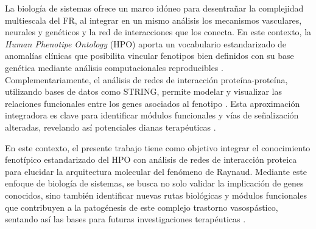 La biología de sistemas ofrece un marco idóneo para desentrañar la complejidad multiescala del FR, al integrar en un mismo análisis los mecanismos vasculares, neurales y genéticos y la red de interacciones que los conecta. En este contexto, la \textit{Human Phenotipe Ontology} (HPO) aporta un vocabulario estandarizado de anomalías clínicas que posibilita vincular fenotipos bien definidos con su base genética mediante análisis computacionales reproducibles \cite{Khler2021, Robinson2008, Groza2023}. Complementariamente, el análisis de redes de interacción proteína-proteína, utilizando bases de datos como STRING, permite modelar y visualizar las relaciones funcionales entre los genes asociados al fenotipo \cite{Szklarczyk2025, Orchard2014}. Esta aproximación integradora es clave para identificar módulos funcionales y vías de señalización alteradas, revelando así potenciales dianas terapéuticas \cite{Consortium2021, Naylor2010, Fischer2025, Ideker2011}.

En este contexto, el presente trabajo tiene como objetivo integrar el conocimiento fenotípico estandarizado del HPO con análisis de redes de interacción proteica para elucidar la arquitectura molecular del fenómeno de Raynaud. Mediante este enfoque de biología de sistemas, se busca no solo validar la implicación de genes conocidos, sino también identificar nuevas rutas biológicas y módulos funcionales que contribuyen a la patogénesis de este complejo trastorno vasospástico, sentando así las bases para futuras investigaciones terapéuticas \cite{Naylor2010, Fischer2025, Barabsi2011}.